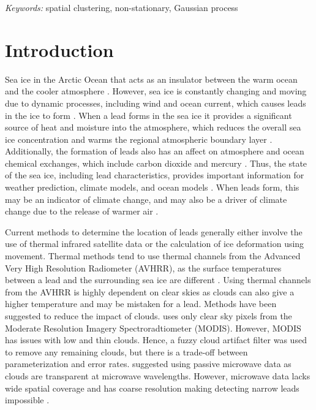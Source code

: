 \documentclass[12pt]{article}
\begin{document}
\noindent%
{\it Keywords:} spatial clustering, non-stationary, Gaussian process
\vfill

\newpage
{} %

\hypertarget{introduction}{%
\section{Introduction}\label{introduction}}

Sea ice in the Arctic Ocean that acts as an insulator between the warm
ocean and the cooler atmosphere \citep{peterson_evaluating_2011}.
However, sea ice is constantly changing and moving due to dynamic
processes, including wind and ocean current, which causes leads in the
ice to form \citetext{\citealp{peterson_evaluating_2011}; \citealp[
]{hoffman_detection_2019}; \citealp{hutter_leads_2019}}. When a lead
forms in the sea ice it provides a significant source of heat and
moisture into the atmosphere, which reduces the overall sea ice
concentration and warms the regional atmospheric boundary layer
\citep[\citet{reiser_new_2020}]{key_detectability_1993}. Additionally,
the formation of leads also has an affect on atmosphere and ocean
chemical exchanges, which include carbon dioxide and mercury
\citep{hoffman_detection_2019}. Thus, the state of the sea ice,
including lead characteristics, provides important information for
weather prediction, climate models, and ocean models
\citep{reiser_new_2020}. When leads form, this may be an indicator of
climate change, and may also be a driver of climate change due to the
release of warmer air \citep{peterson_evaluating_2011}.

Current methods to determine the location of leads generally either
involve the use of thermal infrared satellite data or the calculation of
ice deformation using movement. Thermal methods tend to use thermal
channels from the Advanced Very High Resolution Radiometer (AVHRR), as
the surface temperatures between a lead and the surrounding sea ice are
different \citep{key_detectability_1993}. Using thermal channels from
the AVHRR is highly dependent on clear skies as clouds can also give a
higher temperature and may be mistaken for a lead. Methods have been
suggested to reduce the impact of clouds.
\citet{willmes_pan-arctic_2015} uses only clear sky pixels from the
Moderate Resolution Imagery Spectroradtiometer (MODIS). However, MODIS
has issues with low and thin clouds. Hence, a fuzzy cloud artifact
filter was used to remove any remaining clouds, but there is a trade-off
between parameterization and error rates. \citet{rohrs_algorithm_2012}
suggested using passive microwave data as clouds are transparent at
microwave wavelengths. However, microwave data lacks wide spatial
coverage and has coarse resolution making detecting narrow leads
impossible \citep{hoffman_detection_2019}.
\end{document}
